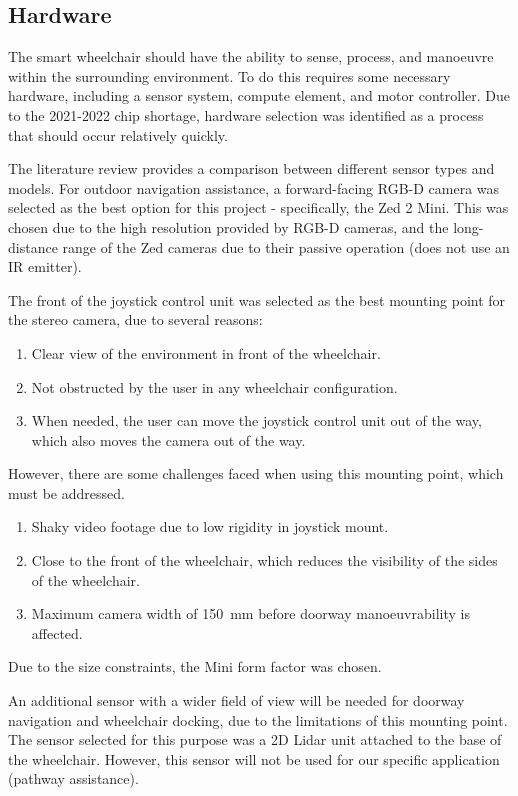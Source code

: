 \subsection{Hardware}
The smart wheelchair should have the ability to sense, process, and manoeuvre within the surrounding environment.
To do this requires some necessary hardware, including a sensor system, compute element, and motor controller.
Due to the 2021-2022 chip shortage, hardware selection was identified as a process that should occur relatively quickly.

The literature review provides a comparison between different sensor types and models. For outdoor navigation assistance,
a forward-facing RGB-D camera was selected as the best option for this project - specifically, the Zed 2 Mini.
This was chosen due to the high resolution provided by RGB-D cameras, and the long-distance range of the Zed cameras due to 
their passive operation (does not use an IR emitter).

The front of the joystick control unit was selected as the best mounting point for the
stereo camera, due to several reasons:
\begin{enumerate}[topsep=0pt,itemsep=-1ex,partopsep=1ex,parsep=1ex]
    \item Clear view of the environment in front of the wheelchair.
    \item Not obstructed by the user in any wheelchair configuration.
    \item When needed, the user can move the joystick control unit out of the way,
            which also moves the camera out of the way.
\end{enumerate}
However, there are some challenges faced when using this mounting point, which must be addressed.
\begin{enumerate}[topsep=0pt,itemsep=-1ex,partopsep=1ex,parsep=1ex]
    \item Shaky video footage due to low rigidity in joystick mount.
    \item Close to the front of the wheelchair, which reduces the visibility of the sides of the wheelchair.
    \item Maximum camera width of \SI{150}{\milli\metre} before doorway manoeuvrability is affected.
\end{enumerate}
Due to the size constraints, the Mini form factor was chosen.

An additional sensor with a wider field of view will be needed for doorway navigation
and wheelchair docking, due to the limitations of this mounting point. The sensor selected for this purpose
was a 2D Lidar unit attached to the base of the wheelchair. However, this sensor will not be used for
our specific application (pathway assistance).

